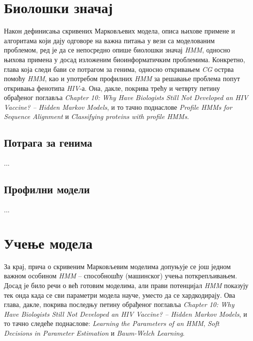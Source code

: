 \documentclass[12pt,oneside]{memoir}
\begin{document}
\begin{CJK}{UTF8}{ipxm}
\chapter{Биолошки значај}
Након дефинисања скривених Марковљевих модела, описа њихове примене и алгоритама који дају одговоре на важна питања у вези са моделованим проблемом, ред је да се непосредно опише биолошки значај \textit{HMM}, односно њихова примена у досад изложеним биоинформатичким проблемима. Конкретно, глава која следи бави се потрагом за генима, односно откривањем \textit{CG} острва помоћу \textit{HMM}, као и употребом профилних \textit{HMM} за решавање проблема попут откривања фенотипа \textit{HIV}-а. Она, дакле, покрива трећу и четврту петину обрађеног поглавља \textit{Chapter 10: Why Have Biologists Still Not Developed an HIV Vaccine? -- Hidden Markov Models}, и то тачно поднаслове \textit{Profile HMMs for Sequence Alignment} и \textit{Classifying proteins with profile HMMs}.

\section{Потрага за генима}
...

\section{Профилни модели}
...

\chapter{Учење модела}
За крај, прича о скривеним Марковљевим моделима допуњује се још једном важном особином \textit{HMM} -- способношћу (машинског) учења поткрепљивањем. Досад је било речи о већ готовим моделима, али прави потенцијал \textit{HMM} показују тек онда када се сви параметри модела науче, уместо да се хардкодирају. Ова глава, дакле, покрива последњу петину обрађеног поглавља \textit{Chapter 10: Why Have Biologists Still Not Developed an HIV Vaccine? -- Hidden Markov Models}, и то тачно следеће поднаслове: \textit{Learning the Parameters of an HMM}, \textit{Soft Decisions in Parameter Estimation} и \textit{Baum-Welch Learning}.


\end{CJK}
\end{document}
